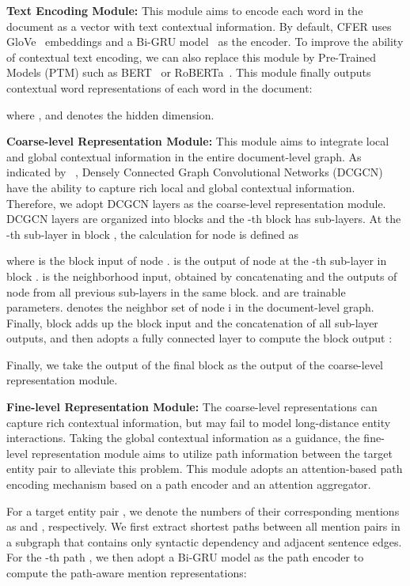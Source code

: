 \documentclass{article}
\newcommand{\citep}{\cite}
\newcommand{\citet}[1]{\citeauthor{#1}~\shortcite{#1}}
\begin{document}
\noindent\textbf{Text Encoding Module:} 
This module aims to encode each word in the document as a vector with text contextual information. 
By default, CFER uses GloVe~\citep{glove} embeddings and a Bi-GRU model~\citep{gru,bi_rnn} as the encoder. 
To improve the ability of contextual text encoding, we can also replace this module by Pre-Trained Models (PTM) such as BERT~\citep{bert} or RoBERTa~\citep{roberta}. 
This module finally outputs contextual word representations  of each word in the document: 

where , and  denotes the hidden dimension. 

\noindent\textbf{Coarse-level Representation Module:} 
This module aims to integrate local and global contextual information in the entire document-level graph. 
As indicated by \citet{dcgcn}, Densely Connected Graph Convolutional Networks (DCGCN) have the ability to capture rich local and global contextual information. 
Therefore, we adopt DCGCN layers as the coarse-level representation module. 
DCGCN layers are organized into  blocks and the -th block has  sub-layers. 
At the -th sub-layer in block , the calculation for node  is defined as 

where  is the block input of node . 
 is the output of node  at the -th sub-layer in block . 
 is the neighborhood input, obtained by concatenating  and the outputs of node  from all previous sub-layers in the same block. 
 and  are trainable parameters. 
 denotes the neighbor set of node i in the document-level graph. 
Finally, block  adds up the block input and the concatenation of all sub-layer outputs, and then adopts a fully connected layer to compute the block output : 

Finally, we take the output of the final block  as the output of the coarse-level representation module. 

\noindent\textbf{Fine-level Representation Module:} 
The coarse-level representations can capture rich contextual information, but may fail to model long-distance entity interactions. 
Taking the global contextual information as a guidance, the fine-level representation module aims to utilize path information between the target entity pair to alleviate this problem. 
This module adopts an attention-based path encoding mechanism based on a path encoder and an attention aggregator. 

For a target entity pair , we denote the numbers of their corresponding mentions as  and , respectively. 
We first extract  shortest paths between all mention pairs in a subgraph that contains only syntactic dependency and adjacent sentence edges. 
For the -th path ,  we then adopt a Bi-GRU model as the path encoder to compute the path-aware mention representations: 
\end{document}
